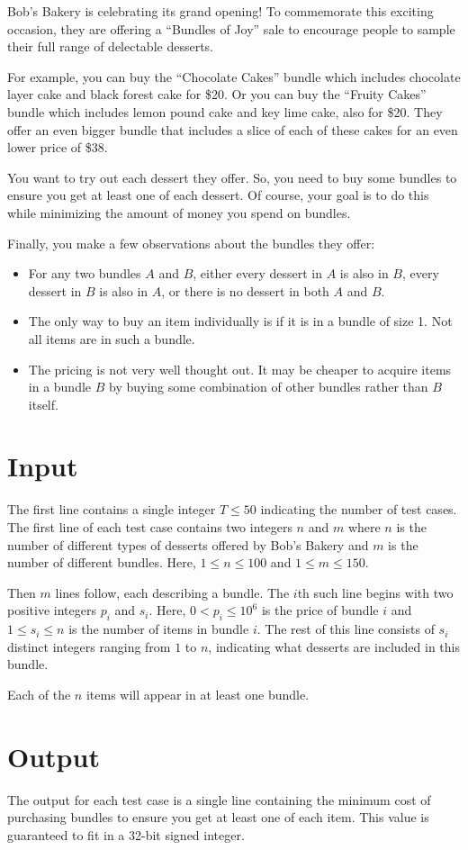 
\setlength{\columnsep}{15pt}


Bob's Bakery is celebrating its grand opening! To commemorate this exciting
occasion, they are offering a ``Bundles of Joy'' sale to encourage
people to sample their full range of delectable desserts.

For example, you can buy the ``Chocolate Cakes'' bundle which includes
chocolate layer cake and black forest cake for \$20.
Or you can buy the ``Fruity Cakes'' bundle which includes
lemon pound cake and key lime cake, also for \$20.
They offer an even bigger bundle that includes a slice of each of these cakes
for an even lower price of \$38.

You want to try out each dessert they offer. So, you need to buy some bundles
to ensure you get at least one of each dessert. Of course, your goal
is to do this while minimizing the amount of money you spend on bundles.

Finally, you make a few observations about the bundles they offer:
\begin{itemize}
\item For any two bundles $A$ and $B$, either every dessert in $A$ is
also in $B$, every dessert in $B$ is also in $A$, or there is no dessert
in both $A$ and $B$.

\item The only way to buy an item individually is if it is in a bundle
of size 1. Not all items are in such a bundle.

\item The pricing is not very well thought out. It may be cheaper
to acquire items in a bundle $B$ by buying some combination
of other bundles rather than $B$ itself.
\end{itemize}

\section*{Input}
The first line contains a single integer $T \leq 50$ indicating the
number of test cases. The first line of each test case
contains two integers $n$ and $m$ where $n$ is the number of different types
of desserts offered by Bob's Bakery and $m$ is the number of different bundles.
Here, $1 \leq n \leq 100$ and $1 \leq m \leq 150$.

Then $m$ lines follow, each describing a bundle. The $i$th such line
begins with two positive integers $p_i$ and $s_i$. Here, $0 < p_i \leq 10^6$
is the price of bundle $i$ and $1 \leq s_i \leq n$
is the number of items in bundle $i$.
The rest of this line consists of $s_i$ distinct integers ranging from $1$
to $n$, indicating what desserts are included in this bundle.

Each of the $n$ items will appear in at least one bundle.

\section*{Output}
The output for each test case is a single line containing the minimum
cost of purchasing bundles to ensure you get at least one of each item.
This value is guaranteed to fit in a 32-bit signed integer.

